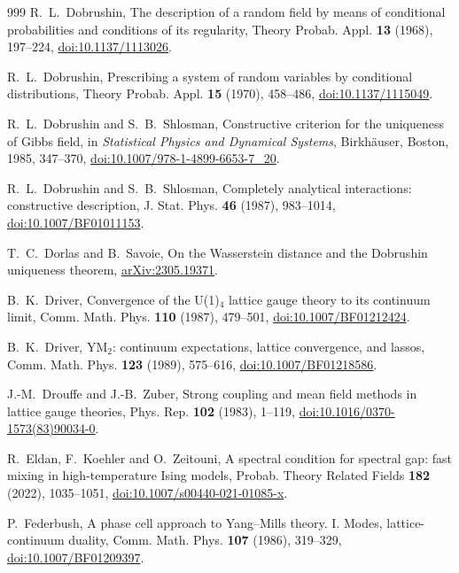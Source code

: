 \documentclass[aps,prd,twocolumn,superscriptaddress,nofootinbib,longbibliography,floatfix,amsmath,amssymb,10pt]{revtex4-2}
\theoremstyle{definition}
\theoremstyle{remark}
\begin{document}
\begin{thebibliography}{999}
R.~L.~Dobrushin, The description of a random field by means of conditional
probabilities and conditions of its regularity, Theory Probab. Appl.
\textbf{13} (1968), 197--224,
\href{https://doi.org/10.1137/1113026}{doi:10.1137/1113026}.

R.~L.~Dobrushin, Prescribing a system of random variables by conditional
distributions, Theory Probab. Appl. \textbf{15} (1970), 458--486,
\href{https://doi.org/10.1137/1115049}{doi:10.1137/1115049}.

R.~L.~Dobrushin and S.~B.~Shlosman, Constructive criterion for the uniqueness
of Gibbs field, in \emph{Statistical Physics and Dynamical Systems},
Birkh\"auser, Boston, 1985, 347--370,
\href{https://doi.org/10.1007/978-1-4899-6653-7_20}{doi:10.1007/978-1-4899-6653-7\_20}.

R.~L.~Dobrushin and S.~B.~Shlosman, Completely analytical interactions:
constructive description, J. Stat. Phys. \textbf{46} (1987), 983--1014,
\href{https://doi.org/10.1007/BF01011153}{doi:10.1007/BF01011153}.

T.~C.~Dorlas and B.~Savoie, On the Wasserstein distance and the Dobrushin
uniqueness theorem, \href{https://arxiv.org/abs/2305.19371}{arXiv:2305.19371}.

B.~K.~Driver, Convergence of the U(1)$_4$ lattice gauge theory to its
continuum limit, Comm. Math. Phys. \textbf{110} (1987), 479--501,
\href{https://doi.org/10.1007/BF01212424}{doi:10.1007/BF01212424}.

B.~K.~Driver, YM$_2$: continuum expectations, lattice convergence, and
lassos, Comm. Math. Phys. \textbf{123} (1989), 575--616,
\href{https://doi.org/10.1007/BF01218586}{doi:10.1007/BF01218586}.

J.-M.~Drouffe and J.-B.~Zuber, Strong coupling and mean field methods in
lattice gauge theories, Phys. Rep. \textbf{102} (1983), 1--119,
\href{https://doi.org/10.1016/0370-1573(83)90034-0}{doi:10.1016/0370-1573(83)90034-0}.

R.~Eldan, F.~Koehler and O.~Zeitouni, A spectral condition for spectral
gap: fast mixing in high-temperature Ising models, Probab. Theory Related
Fields \textbf{182} (2022), 1035--1051,
\href{https://doi.org/10.1007/s00440-021-01085-x}{doi:10.1007/s00440-021-01085-x}.

P.~Federbush, A phase cell approach to Yang--Mills theory. I. Modes,
lattice-continuum duality, Comm. Math. Phys. \textbf{107} (1986), 319--329,
\href{https://doi.org/10.1007/BF01209397}{doi:10.1007/BF01209397}.


\end{thebibliography}
\end{document}
